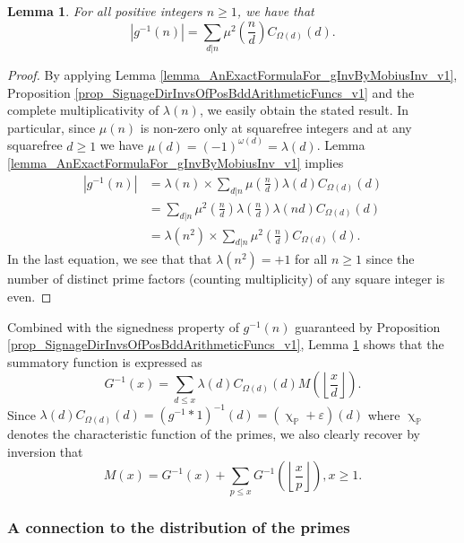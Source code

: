\documentclass[11pt,reqno,a4letter]{article}
\numberwithin{figure}{section}
\numberwithin{table}{section}
\renewcommand{\chi}{\upchi}
\newcommand{\Floor}[2]{\ensuremath{\left\lfloor \frac{#1}{#2} \right\rfloor}}
\theoremstyle{plain}
\newtheorem{lemma}[theorem]{Lemma}
\numberwithin{theorem}{section}
\theoremstyle{definition}
\begin{document}
\begin{lemma} 
\label{lemma_AbsValueOf_gInvn_FornSquareFree_v1} 
For all positive integers $n \geq 1$, we have that 
\begin{equation} 
\label{eqn_AbsValueOf_gInvn_FornSquareFree_v1} 
|g^{-1}(n)| = \sum_{d|n} \mu^2\left(\frac{n}{d}\right) C_{\Omega(d)}(d). 
\end{equation} 
\end{lemma} 
\begin{proof} 
By applying 
Lemma \ref{lemma_AnExactFormulaFor_gInvByMobiusInv_v1}, 
Proposition \ref{prop_SignageDirInvsOfPosBddArithmeticFuncs_v1} and the 
complete multiplicativity of $\lambda(n)$, 
we easily obtain the stated result. 
In particular, since $\mu(n)$ is non-zero only at squarefree integers and 
at any squarefree $d \geq 1$ we have $\mu(d) = (-1)^{\omega(d)} = \lambda(d)$. 
Lemma \ref{lemma_AnExactFormulaFor_gInvByMobiusInv_v1} implies 
\begin{align*} 
|g^{-1}(n)| & = \lambda(n) \times \sum_{d|n} \mu\left(\frac{n}{d}\right) \lambda(d) C_{\Omega(d)}(d) \\ 
     & = \sum_{d|n} \mu^2\left(\frac{n}{d}\right) \lambda\left(\frac{n}{d}\right) 
     \lambda(nd) C_{\Omega(d)}(d) \\ 
     & = \lambda(n^2) \times \sum_{d|n} \mu^2\left(\frac{n}{d}\right) C_{\Omega(d)}(d). 
\end{align*} 
In the last equation, we see that 
that $\lambda(n^2) = +1$ for all $n \geq 1$ since the number of distinct 
prime factors (counting multiplicity) of any square integer is even. 
\end{proof} 

Combined with the signedness property of $g^{-1}(n)$ guaranteed by 
Proposition \ref{prop_SignageDirInvsOfPosBddArithmeticFuncs_v1}, 
Lemma \ref{lemma_AbsValueOf_gInvn_FornSquareFree_v1} shows that the summatory 
function is expressed as 
\[
G^{-1}(x) = \sum_{d \leq x} \lambda(d) C_{\Omega(d)}(d) M\left(\Floor{x}{d}\right). 
\]
Since $\lambda(d) C_{\Omega(d)}(d) = (g^{-1} \ast 1)^{-1}(d) = (\chi_{\mathbb{P}} + \varepsilon)(d)$ 
where $\chi_{\mathbb{P}}$ denotes the characteristic function of the primes, we also clearly 
recover by inversion that 
\[
M(x) = G^{-1}(x) + \sum_{p \leq x} G^{-1}\left(\Floor{x}{p}\right), x \geq 1. 
\]

\subsubsection{A connection to the distribution of the primes} 
\end{document}

